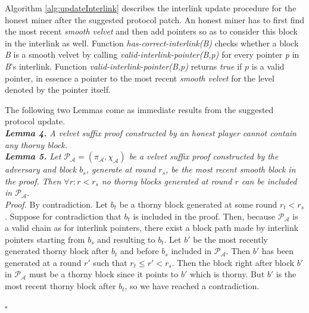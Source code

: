 Algorithm \ref{alg:updateInterlink} describes the interlink update procedure for the
honest miner after the suggested protocol patch. An honest miner has to first find the
most recent \emph{smooth velvet} and then add pointers so as to consider this block in
the interlink as well. Function \textit{has-correct-interlink(B)} checks whether a
block \textit{B} is a smooth velvet by calling \textit{valid-interlink-pointer(B,p)}
for every pointer \textit{p} in \textit{B}'s interlink. Function
\textit{valid-interlink-pointer(B,p)} returns \emph{true} if $p$ is a valid 
pointer, in essence a pointer to the most recent \emph{smooth velvet}
for the level denoted by the pointer itself. 

The following two Lemmas come as immediate results from the suggested protocol
update.\\

\textit{\textbf{Lemma 4.} A velvet suffix proof constructed by an honest player
cannot contain any thorny block.}\\

\textit{\textbf{Lemma 5.} Let $\mathcal{P_A} = (\pi_\mathcal{A}, \chi_\mathcal{A})$
be a velvet suffix proof constructed by the adversary and block $b_s$, generate
at round $r_s$, be the most recent smooth block in the proof. Then $\forall r:r < r_s$
no thorny blocks generated at round $r$ can be included in $\mathcal{P_A}$.}\\
\textit{Proof.} By contradiction. Let $b_t$ be a thorny block generated at
some round $r_t < r_s$. Suppose for contradiction that $b_t$ is included in
the proof. Then, because $\mathcal{P_A}$ is a valid chain as for interlink
pointers, there exist a block path made by interlink pointers starting from $b_s$
and resulting to $b_t$. Let $b'$ be the most recently generated thorny block
after $b_t$ and before $b_s$ included in $\mathcal{P_A}$. 
Then $b'$ has been generated at a round $r'$ such that $r_t \leq r' < r_s$. Then
the block right after block $b'$ in $\mathcal{P_A}$ must be a thorny block since
it points to $b'$ which is thorny. But $b'$ is the most recent thorny block after
$b_t$, so we have reached a contradiction.
\begin{flushright}
$\square$
\end{flushright}

\vspace{4mm}

